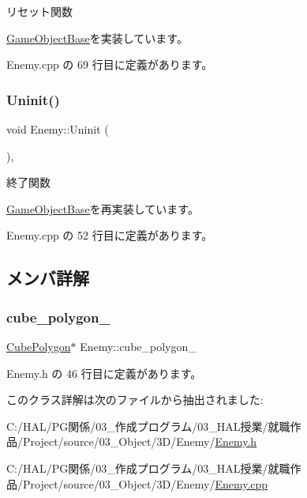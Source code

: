 リセット関数 



\mbox{\hyperlink{class_game_object_base_a85c59554f734bcb09f1a1e18d9517dce}{Game\+Object\+Base}}を実装しています。



 Enemy.\+cpp の 69 行目に定義があります。

\mbox{\label{class_enemy_a9aeaa757abdf0c37fd67c4ce5aed6962}} 
\subsubsection{\texorpdfstring{Uninit()}{Uninit()}}
{\footnotesize\ttfamily void Enemy\+::\+Uninit (\begin{DoxyParamCaption}{ }\end{DoxyParamCaption})\hspace{0.3cm}{\ttfamily [override]}, {\ttfamily [virtual]}}



終了関数 



\mbox{\hyperlink{class_game_object_base_a97e1bc277d7b1c0156d4735de29a022c}{Game\+Object\+Base}}を再実装しています。



 Enemy.\+cpp の 52 行目に定義があります。



\subsection{メンバ詳解}
\mbox{\label{class_enemy_a9a24b765d76b789cc678701886570511}} 
\subsubsection{\texorpdfstring{cube\+\_\+polygon\+\_\+}{cube\_polygon\_}}
{\footnotesize\ttfamily \mbox{\hyperlink{class_cube_polygon}{Cube\+Polygon}}$\ast$ Enemy\+::cube\+\_\+polygon\+\_\+}



 Enemy.\+h の 46 行目に定義があります。



このクラス詳解は次のファイルから抽出されました\+:\begin{DoxyCompactItemize}
\item 
C\+:/\+H\+A\+L/\+P\+G関係/03\+\_\+作成プログラム/03\+\_\+\+H\+A\+L授業/就職作品/\+Project/source/03\+\_\+\+Object/3\+D/\+Enemy/\mbox{\hyperlink{_enemy_8h}{Enemy.\+h}}\item 
C\+:/\+H\+A\+L/\+P\+G関係/03\+\_\+作成プログラム/03\+\_\+\+H\+A\+L授業/就職作品/\+Project/source/03\+\_\+\+Object/3\+D/\+Enemy/\mbox{\hyperlink{_enemy_8cpp}{Enemy.\+cpp}}\end{DoxyCompactItemize}
